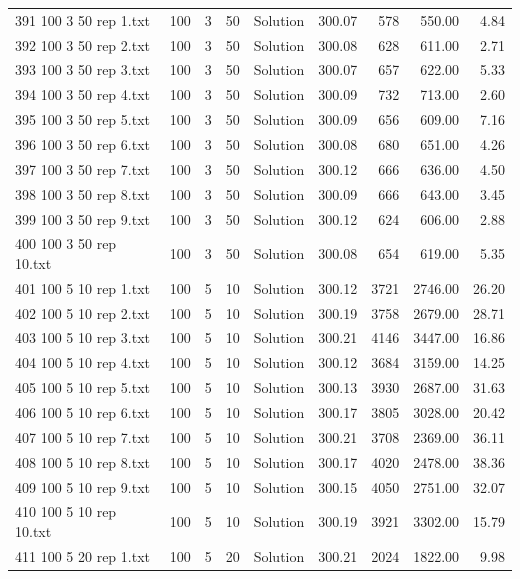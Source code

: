 \begin{longtable}{lrrllrrrr}
391 100 3 50 rep 1.txt & 100 & 3 & 50 & Solution & 300.07 & 578 & 550.00 &  4.84\\
392 100 3 50 rep 2.txt & 100 & 3 & 50 & Solution & 300.08 & 628 & 611.00 &  2.71\\
393 100 3 50 rep 3.txt & 100 & 3 & 50 & Solution & 300.07 & 657 & 622.00 &  5.33\\
394 100 3 50 rep 4.txt & 100 & 3 & 50 & Solution & 300.09 & 732 & 713.00 &  2.60\\
395 100 3 50 rep 5.txt & 100 & 3 & 50 & Solution & 300.09 & 656 & 609.00 &  7.16\\
396 100 3 50 rep 6.txt & 100 & 3 & 50 & Solution & 300.08 & 680 & 651.00 &  4.26\\
397 100 3 50 rep 7.txt & 100 & 3 & 50 & Solution & 300.12 & 666 & 636.00 &  4.50\\
398 100 3 50 rep 8.txt & 100 & 3 & 50 & Solution & 300.09 & 666 & 643.00 &  3.45\\
399 100 3 50 rep 9.txt & 100 & 3 & 50 & Solution & 300.12 & 624 & 606.00 &  2.88\\
400 100 3 50 rep 10.txt & 100 & 3 & 50 & Solution & 300.08 & 654 & 619.00 &  5.35\\
401 100 5 10 rep 1.txt & 100 & 5 & 10 & Solution & 300.12 & 3721 & 2746.00 & 26.20\\
402 100 5 10 rep 2.txt & 100 & 5 & 10 & Solution & 300.19 & 3758 & 2679.00 & 28.71\\
403 100 5 10 rep 3.txt & 100 & 5 & 10 & Solution & 300.21 & 4146 & 3447.00 & 16.86\\
404 100 5 10 rep 4.txt & 100 & 5 & 10 & Solution & 300.12 & 3684 & 3159.00 & 14.25\\
405 100 5 10 rep 5.txt & 100 & 5 & 10 & Solution & 300.13 & 3930 & 2687.00 & 31.63\\
406 100 5 10 rep 6.txt & 100 & 5 & 10 & Solution & 300.17 & 3805 & 3028.00 & 20.42\\
407 100 5 10 rep 7.txt & 100 & 5 & 10 & Solution & 300.21 & 3708 & 2369.00 & 36.11\\
408 100 5 10 rep 8.txt & 100 & 5 & 10 & Solution & 300.17 & 4020 & 2478.00 & 38.36\\
409 100 5 10 rep 9.txt & 100 & 5 & 10 & Solution & 300.15 & 4050 & 2751.00 & 32.07\\
410 100 5 10 rep 10.txt & 100 & 5 & 10 & Solution & 300.19 & 3921 & 3302.00 & 15.79\\
411 100 5 20 rep 1.txt & 100 & 5 & 20 & Solution & 300.21 & 2024 & 1822.00 &  9.98\\

\end{longtable}
